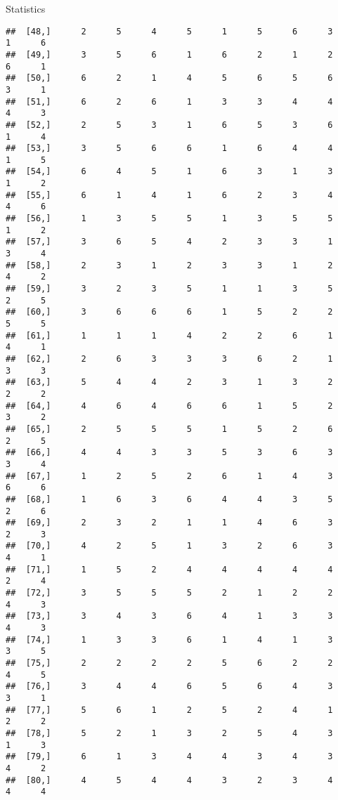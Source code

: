 \documentclass[
  ignorenonframetext,
]{beamer}
\begin{document}
\begin{frame}[fragile]{Statistics}
\begin{verbatim}
##  [48,]      2      5      4      5      1      5      6      3      1      6
##  [49,]      3      5      6      1      6      2      1      2      6      1
##  [50,]      6      2      1      4      5      6      5      6      3      1
##  [51,]      6      2      6      1      3      3      4      4      4      3
##  [52,]      2      5      3      1      6      5      3      6      1      4
##  [53,]      3      5      6      6      1      6      4      4      1      5
##  [54,]      6      4      5      1      6      3      1      3      1      2
##  [55,]      6      1      4      1      6      2      3      4      4      6
##  [56,]      1      3      5      5      1      3      5      5      1      2
##  [57,]      3      6      5      4      2      3      3      1      3      4
##  [58,]      2      3      1      2      3      3      1      2      4      2
##  [59,]      3      2      3      5      1      1      3      5      2      5
##  [60,]      3      6      6      6      1      5      2      2      5      5
##  [61,]      1      1      1      4      2      2      6      1      4      1
##  [62,]      2      6      3      3      3      6      2      1      3      3
##  [63,]      5      4      4      2      3      1      3      2      2      2
##  [64,]      4      6      4      6      6      1      5      2      3      2
##  [65,]      2      5      5      5      1      5      2      6      2      5
##  [66,]      4      4      3      3      5      3      6      3      3      4
##  [67,]      1      2      5      2      6      1      4      3      6      6
##  [68,]      1      6      3      6      4      4      3      5      2      6
##  [69,]      2      3      2      1      1      4      6      3      2      3
##  [70,]      4      2      5      1      3      2      6      3      4      1
##  [71,]      1      5      2      4      4      4      4      4      2      4
##  [72,]      3      5      5      5      2      1      2      2      4      3
##  [73,]      3      4      3      6      4      1      3      3      4      3
##  [74,]      1      3      3      6      1      4      1      3      3      5
##  [75,]      2      2      2      2      5      6      2      2      4      5
##  [76,]      3      4      4      6      5      6      4      3      3      1
##  [77,]      5      6      1      2      5      2      4      1      2      2
##  [78,]      5      2      1      3      2      5      4      3      1      3
##  [79,]      6      1      3      4      4      3      4      3      4      2
##  [80,]      4      5      4      4      3      2      3      4      4      4

\end{verbatim}
\end{frame}
\end{document}
